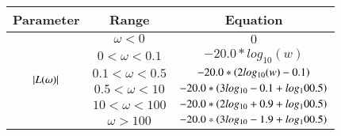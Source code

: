 \begin{tabular}{|c|c|c|}
\hline
    \textbf{Parameter} & \textbf{Range} & \textbf{Equation} \\
    \hline
    \multirow{6}{*}{$\left\vert L(\omega)\right\vert$} & $\omega < 0$ & $0$\\
   \cline{2-3}
   & $0 < \omega < 0.1$ & $-20.0 * log_{10}(w)$ \\
   \cline{2-3}
   & $0.1 < \omega < 0.5 $ & $-20.0 * \left(2log_{10}(w) - 0.1\right)$ \\
   \cline{2-3}
   & $0.5 < \omega < 10 $ & $-20.0 * \left(3log_{10} - 0.1 + log_10{0.5}\right)$ \\
   \cline{2-3}
   & $10 < \omega < 100 $ & $-20.0 * \left(2log_{10} + 0.9 + log_10{0.5}\right)$ \\
   \cline{2-3}
   & $\omega > 100 $ & $-20.0 * \left(3log_{10} - 1.9 + log_10{0.5}\right)$ \\
   \hline
    \end{tabular}
